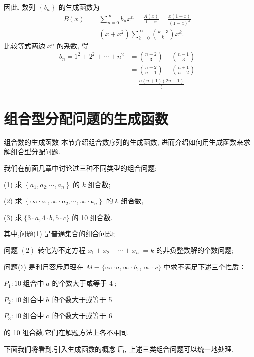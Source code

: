 \documentclass[punct]{ctexbeamer}
\begin{document}
\begin{frame}
因此,
    数列 $\left\{b_{n}\right\}$ 的生成函数为
	$$
	\begin{aligned}
	B(x) &=\sum_{n=0}^{\infty} b_{n} x^{n}=\frac{A(x)}{1-x}=\frac{x(1+x)}{(1-x)^{4}} \\
	&=\left(x+x^{2}\right) \sum_{k=0}^{\infty}\binom{k+3}{k}x^{k}.
	\end{aligned}
	$$
	比较等式两边 $x^{n}$ 的系数, 得
	$$
	\begin{aligned}
b_n=	1^{2}+2^{2}+\cdots+n^{2} &= \binom{n+2}{3}+\binom{n-1}{3} \\
	&=\binom{n+2}{n-1}+\binom{n+1}{n-2} \\
	&=\frac{n(n+1)(2 n+1)}{6}.
	\end{aligned}
	$$
\end{frame}
%


\section{组合型分配问题的生成函数}

\begin{frame}{组合数的生成函数}
	本节介绍组合数序列的生成函数, 进而介绍如何用生成函数来求解组合型分配问题.


	我们在前面几章中讨论过三种不同类型的组合问题:


	(1) 求 $\left\{a_{1}, a_{2}, \cdots, a_{n}\right\}$ 的 $k$ 组合数;

	(2) 求 $\left\{\infty \cdot a_{1}, \infty \cdot a_{2}, \cdots, \infty \cdot a_{n}\right\}$ 的 $k$ 组合数;

	(3) 求 $\{3 \cdot a, 4 \cdot b, 5 \cdot c\}$ 的 10 组合数.

	其中,问题(1) 是普通集合的组合问题;

	 问题 $(2)$ 转化为不定方程 $x_{1}+x_{2}+\cdots+x_{n}$ $=k$ 的非负整数解的个数问题;


\end{frame}

\begin{frame}
	 问题(3) 是利用容斥原理在 $M=\{\infty \cdot a, \infty \cdot b,$, $\infty \cdot c\}$ 中求不满足下述三个性质：

	$P_{1}: 10$ 组合中 $a$ 的个数大于或等于 4 ;

	$P_{2}: 10$ 组合中 $b$ 的个数大于或等于 5 ;

	$P_{3}: 10$ 组合中 $c$ 的个数大于或等于 6

	的 10 组合数,它们在解题方法上各不相同.

	下面我们将看到,引入生成函数的概念 后, 上述三类组合问题可以统一地处理.
\end{frame}
\end{document}
